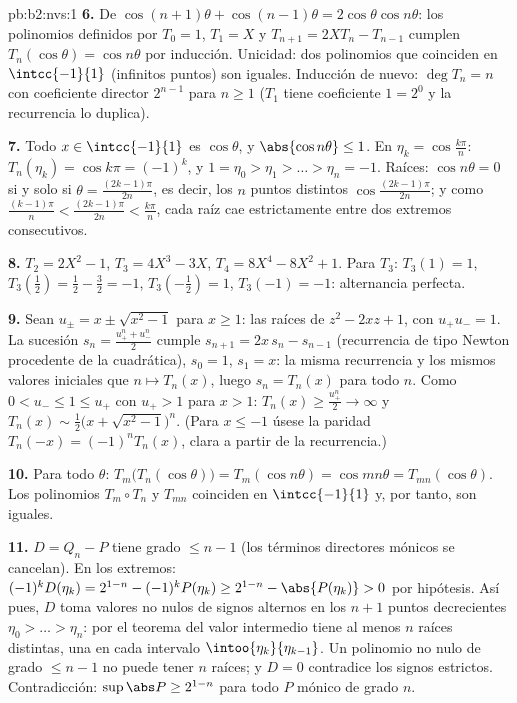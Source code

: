 \begin{solution}{pb:b2:nvs:1}
\textbf{6.} De $\cos(n{+}1)\theta + \cos(n{-}1)\theta =
2\cos\theta\cos n\theta$: los polinomios definidos por $T_0 = 1$,
$T_1 = X$ y $T_{n+1} = 2XT_n - T_{n-1}$ cumplen $T_n(\cos\theta) =
\cos n\theta$ por inducción. Unicidad: dos polinomios que
coinciden en $\intcc{-1}{1}$ (infinitos puntos) son iguales.
Inducción de nuevo: $\deg T_n = n$ con coeficiente director
$2^{n-1}$ para $n \geq 1$ ($T_1$ tiene coeficiente $1 = 2^0$ y la
recurrencia lo duplica).

\textbf{7.} Todo $x \in \intcc{-1}{1}$ es $\cos\theta$, y
$\abs{\cos n\theta} \leq 1$. En $\eta_k = \cos\frac{k\pi}n$:
$T_n(\eta_k) = \cos k\pi = (-1)^k$, y $1 = \eta_0 > \eta_1 > \dots
> \eta_n = -1$. Raíces: $\cos n\theta = 0$ si y solo si $\theta =
\frac{(2k-1)\pi}{2n}$, es decir, los $n$ puntos distintos
$\cos\frac{(2k-1)\pi}{2n}$; y como $\frac{(k-1)\pi}n <
\frac{(2k-1)\pi}{2n} < \frac{k\pi}n$, cada raíz cae estrictamente
entre dos extremos consecutivos.

\textbf{8.} $T_2 = 2X^2 - 1$, $T_3 = 4X^3 - 3X$, $T_4 = 8X^4 -
8X^2 + 1$. Para $T_3$: $T_3(1) = 1$, $T_3(\tfrac12) = \tfrac12 -
\tfrac32 = -1$, $T_3(-\tfrac12) = 1$, $T_3(-1) = -1$: alternancia
perfecta.

\textbf{9.} Sean $u_\pm = x \pm \sqrt{x^2 - 1}$ para $x \geq 1$:
las raíces de $z^2 - 2xz + 1$, con $u_+u_- = 1$. La sucesión $s_n
= \frac{u_+^n + u_-^n}2$ cumple $s_{n+1} = 2x\,s_n - s_{n-1}$
(recurrencia de tipo Newton procedente de la cuadrática), $s_0 =
1$, $s_1 = x$: la misma recurrencia y los mismos valores iniciales
que $n \mapsto T_n(x)$, luego $s_n = T_n(x)$ para todo $n$. Como
$0 < u_- \leq 1 \leq u_+$ con $u_+ > 1$ para $x > 1$: $T_n(x) \geq
\frac{u_+^n}2 \to \infty$ y $T_n(x) \sim \frac12\bigl(x +
\sqrt{x^2-1}\bigr)^n$. (Para $x \leq -1$ úsese la paridad
$T_n(-x) = (-1)^nT_n(x)$, clara a partir de la recurrencia.)

\textbf{10.} Para todo $\theta$: $T_m\bigl(T_n(\cos\theta)\bigr) =
T_m(\cos n\theta) = \cos mn\theta = T_{mn}(\cos\theta)$. Los
polinomios $T_m \circ T_n$ y $T_{mn}$ coinciden en $\intcc{-1}{1}$
y, por tanto, son iguales.

\textbf{11.} $D = Q_n - P$ tiene grado $\leq n - 1$ (los términos
directores mónicos se cancelan). En los extremos: $(-1)^kD(\eta_k)
= 2^{1-n} - (-1)^kP(\eta_k) \geq 2^{1-n} - \abs{P(\eta_k)} > 0$
por hipótesis. Así pues, $D$ toma valores no nulos de signos
alternos en los $n + 1$ puntos decrecientes $\eta_0 > \dots >
\eta_n$: por el teorema del valor intermedio tiene al menos $n$
raíces distintas, una en cada intervalo 
$\intoo{\eta_{k}}{\eta_{k-1}}$. Un polinomio no nulo de grado
$\leq n - 1$ no puede tener $n$ raíces; y $D = 0$ contradice los
signos estrictos. Contradicción: $\sup\abs P \geq 2^{1-n}$ para
todo $P$ mónico de grado $n$.


\end{solution}
